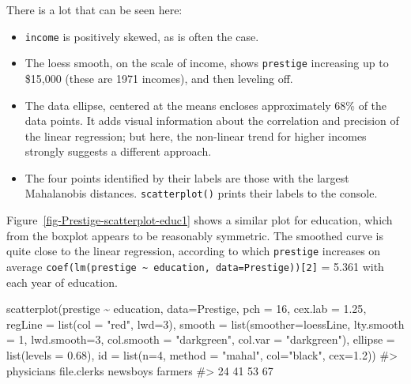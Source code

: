 \documentclass[
  letterpaper,
  10pt,
  krantz2]{krantz}
\makeatletter
\newenvironment{Shaded}{\begin{snugshade}}{\end{snugshade}}
\newcommand{\AttributeTok}[1]{\textcolor[rgb]{0.40,0.45,0.13}{#1}}
\newcommand{\CommentTok}[1]{\textcolor[rgb]{0.37,0.37,0.37}{#1}}
\newcommand{\DecValTok}[1]{\textcolor[rgb]{0.68,0.00,0.00}{#1}}
\newcommand{\FloatTok}[1]{\textcolor[rgb]{0.68,0.00,0.00}{#1}}
\newcommand{\FunctionTok}[1]{\textcolor[rgb]{0.28,0.35,0.67}{#1}}
\newcommand{\NormalTok}[1]{\textcolor[rgb]{0.00,0.23,0.31}{#1}}
\newcommand{\SpecialCharTok}[1]{\textcolor[rgb]{0.37,0.37,0.37}{#1}}
\newcommand{\StringTok}[1]{\textcolor[rgb]{0.13,0.47,0.30}{#1}}
\providecommand{\tightlist}{%
  \setlength{\itemsep}{0pt}\setlength{\parskip}{0pt}}\usepackage{longtable,booktabs,array}
\newenvironment{kframe}{%
  \medskip{}
  \setlength{\fboxsep}{.8em}
  \def\at@end@of@kframe{}%
  \ifinner\ifhmode%
  \def\at@end@of@kframe{\end{minipage}}%
  \begin{minipage}{\columnwidth}%
  \fi\fi%
  \def\FrameCommand##1{\hskip\@totalleftmargin \hskip-\fboxsep
  \colorbox{shadecolor}{##1}\hskip-\fboxsep
      \hskip-\linewidth \hskip-\@totalleftmargin \hskip\columnwidth}%
  \MakeFramed {\advance\hsize-\width
    \@totalleftmargin\z@ \linewidth\hsize
    \@setminipage}}%
{\par\unskip\endMakeFramed%
  \at@end@of@kframe}
\renewenvironment{Shaded}{\begin{kframe}}{\end{kframe}}
\makeatother
\begin{document}
There is a lot that can be seen here:

\begin{itemize}
\tightlist
\item
  \texttt{income} is positively skewed, as is often the case.
\item
  The loess smooth, on the scale of income, shows \texttt{prestige}
  increasing up to \$15,000 (these are 1971 incomes), and then leveling
  off.
\item
  The data ellipse, centered at the means encloses approximately 68\% of
  the data points. It adds visual information about the correlation and
  precision of the linear regression; but here, the non-linear trend for
  higher incomes strongly suggests a different approach.
\item
  The four points identified by their labels are those with the largest
  Mahalanobis distances. \texttt{scatterplot()} prints their labels to
  the console.
\end{itemize}

Figure~\ref{fig-Prestige-scatterplot-educ1} shows a similar plot for
education, which from the boxplot appears to be reasonably symmetric.
The smoothed curve is quite close to the linear regression, according to
which \texttt{prestige} increases on average
\texttt{coef(lm(prestige\ \textasciitilde{}\ education,\ data=Prestige)){[}2{]}}
= 5.361 with each year of education.

\begin{Shaded}
\begin{Highlighting}[]
\FunctionTok{scatterplot}\NormalTok{(prestige }\SpecialCharTok{\textasciitilde{}}\NormalTok{ education, }\AttributeTok{data=}\NormalTok{Prestige,}
  \AttributeTok{pch =} \DecValTok{16}\NormalTok{, }\AttributeTok{cex.lab =} \FloatTok{1.25}\NormalTok{,}
  \AttributeTok{regLine =} \FunctionTok{list}\NormalTok{(}\AttributeTok{col =} \StringTok{"red"}\NormalTok{, }\AttributeTok{lwd=}\DecValTok{3}\NormalTok{),}
  \AttributeTok{smooth =} \FunctionTok{list}\NormalTok{(}\AttributeTok{smoother=}\NormalTok{loessLine, }
                \AttributeTok{lty.smooth =} \DecValTok{1}\NormalTok{, }\AttributeTok{lwd.smooth=}\DecValTok{3}\NormalTok{,}
                \AttributeTok{col.smooth =} \StringTok{"darkgreen"}\NormalTok{, }\AttributeTok{col.var =} \StringTok{"darkgreen"}\NormalTok{),}
  \AttributeTok{ellipse =} \FunctionTok{list}\NormalTok{(}\AttributeTok{levels =} \FloatTok{0.68}\NormalTok{),}
  \AttributeTok{id =} \FunctionTok{list}\NormalTok{(}\AttributeTok{n=}\DecValTok{4}\NormalTok{, }\AttributeTok{method =} \StringTok{"mahal"}\NormalTok{, }\AttributeTok{col=}\StringTok{"black"}\NormalTok{, }\AttributeTok{cex=}\FloatTok{1.2}\NormalTok{))}
\CommentTok{\#\textgreater{}  physicians file.clerks    newsboys     farmers }
\CommentTok{\#\textgreater{}          24          41          53          67}
\end{Highlighting}
\end{Shaded}
\end{document}

